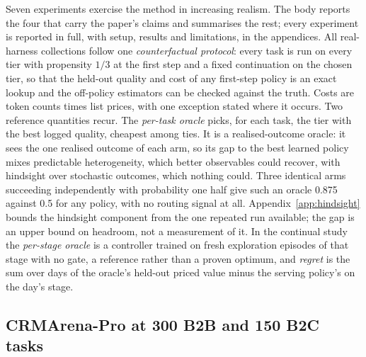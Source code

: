 \documentclass[10pt]{article}
\begin{document}
Seven experiments exercise the method in increasing realism. The body reports the four that carry the paper's claims and summarises the rest; every experiment is reported in full, with setup, results and limitations, in the appendices. All real-harness collections follow one \emph{counterfactual protocol}: every task is run on every tier with propensity $1/3$ at the first step and a fixed continuation on the chosen tier, so that the held-out quality and cost of any first-step policy is an exact lookup and the off-policy estimators can be checked against the truth. Costs are token counts times list prices, with one exception stated where it occurs. Two reference quantities recur. The \emph{per-task oracle} picks, for each task, the tier with the best logged quality, cheapest among ties. It is a realised-outcome oracle: it sees the one realised outcome of each arm, so its gap to the best learned policy mixes predictable heterogeneity, which better observables could recover, with hindsight over stochastic outcomes, which nothing could. Three identical arms succeeding independently with probability one half give such an oracle 0.875 against 0.5 for any policy, with no routing signal at all. Appendix~\ref{app:hindsight} bounds the hindsight component from the one repeated run available; the gap is an upper bound on headroom, not a measurement of it. In the continual study the \emph{per-stage oracle} is a controller trained on fresh exploration episodes of that stage with no gate, a reference rather than a proven optimum, and \emph{regret} is the sum over days of the oracle's held-out priced value minus the serving policy's on the day's stage.

\subsection{CRMArena-Pro at 300 B2B and 150 B2C tasks}
\label{sec:crm300}
\end{document}

